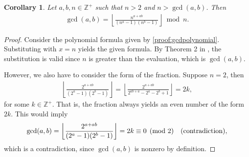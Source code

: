 \documentclass{article}
\theoremstyle{plain}
\newtheorem{corollary}[theorem]{Corollary}
\theoremstyle{definition}
\newcommand{\floor}[1]{\left\lfloor #1 \right\rfloor}
\newcommand{\Z}{\mathbb{Z}}
\begin{document}
\begin{corollary} \label{proof:gcdintegerbase}
Let $a,b,n \in \Z^+$ such that $n > 2$ and $n > \gcd(a,b)$. Then
\begin{align*}
\gcd(a,b) = \floor{\frac{n^{a+ab}}{(n^a-1)(n^b-1)}} \bmod n .
\end{align*}
\end{corollary}
\begin{proof}
Consider the polynomial formula given by \cref{proof:gcdpolynomial}. Substituting with $x = n$ yields the given formula. By Theorem 2 in  \cite{shunia2024polynomial}, the substitution is valid since $n$ is greater than the evaluation, which is $\gcd(a,b)$.

However, we also have to consider the form of the fraction. Suppose $n = 2$, then
\begin{align*}
\floor{\frac{2^{a+ab}}{(2^a-1)(2^b-1)}}
= \floor{\frac{2^{a+ab}}{2^{ab+a} - 2^a - 2^b + 1}} = 2k ,
\end{align*}
for some $k \in \Z^+$. That is, the fraction always yields an even number of the form $2k$. This would imply
\begin{align*}
\gcd(a,b) = \floor{\frac{2^{a+ab}}{(2^a-1)(2^b-1)}} = 2k \equiv 0 \pmod 2 \quad \textup{(contradiction)} ,
\end{align*}
which is a contradiction, since $\gcd(a,b)$ is nonzero by definition.
\end{proof}
\end{document}
